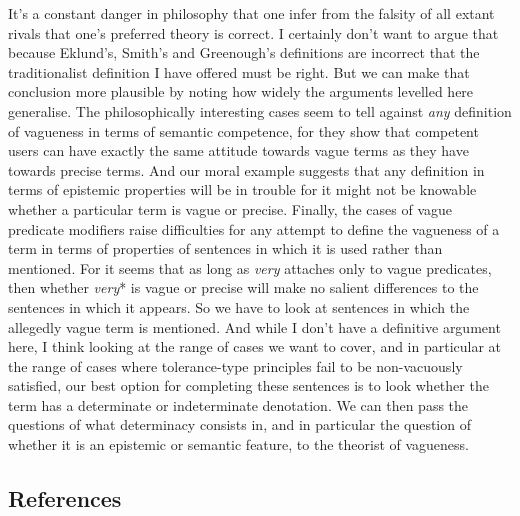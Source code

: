 \documentclass[
  10pt,
  letterpaper,
  DIV=11,
  numbers=noendperiod,
  twoside]{scrartcl}
\begin{document}
It's a constant danger in philosophy that one infer from the falsity of
all extant rivals that one's preferred theory is correct. I certainly
don't want to argue that because Eklund's, Smith's and Greenough's
definitions are incorrect that the traditionalist definition I have
offered must be right. But we can make that conclusion more plausible by
noting how widely the arguments levelled here generalise. The
philosophically interesting cases seem to tell against \emph{any}
definition of vagueness in terms of semantic competence, for they show
that competent users can have exactly the same attitude towards vague
terms as they have towards precise terms. And our moral example suggests
that any definition in terms of epistemic properties will be in trouble
for it might not be knowable whether a particular term is vague or
precise. Finally, the cases of vague predicate modifiers raise
difficulties for any attempt to define the vagueness of a term in terms
of properties of sentences in which it is used rather than mentioned.
For it seems that as long as \emph{very} attaches only to vague
predicates, then whether \emph{very}* is vague or precise will make no
salient differences to the sentences in which it appears. So we have to
look at sentences in which the allegedly vague term is mentioned. And
while I don't have a definitive argument here, I think looking at the
range of cases we want to cover, and in particular at the range of cases
where tolerance-type principles fail to be non-vacuously satisfied, our
best option for completing these sentences is to look whether the term
has a determinate or indeterminate denotation. We can then pass the
questions of what determinacy consists in, and in particular the
question of whether it is an epistemic or semantic feature, to the
theorist of vagueness.

\subsection*{References}\label{references}
\end{document}
